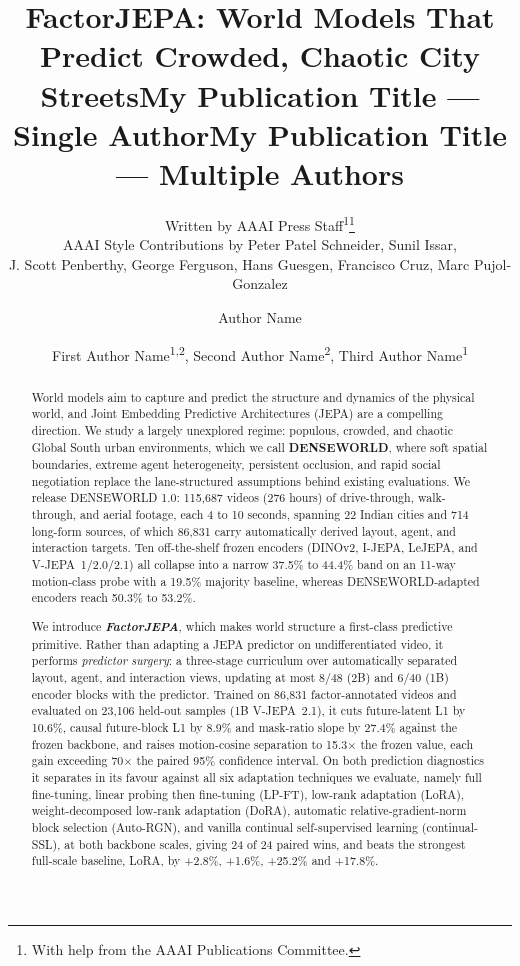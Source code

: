 \documentclass[letterpaper]{article} %
\title{FactorJEPA: World Models That Predict Crowded, Chaotic City Streets}
\author{
    Written by AAAI Press Staff\textsuperscript{\rm 1}\thanks{With help from the AAAI Publications Committee.}\\
    AAAI Style Contributions by Peter Patel Schneider,
    Sunil Issar,\\
    J. Scott Penberthy,
    George Ferguson,
    Hans Guesgen,
    Francisco Cruz\equalcontrib\corresponding,
    Marc Pujol-Gonzalez\equalcontrib\corresponding
}
\title{My Publication Title --- Single Author}
\author {
    Author Name
}
\title{My Publication Title --- Multiple Authors}
\author {
    First Author Name\textsuperscript{\rm 1,\rm 2}\equalcontrib,
    Second Author Name\textsuperscript{\rm 2}\equalcontrib,
    Third Author Name\textsuperscript{\rm 1}\corresponding
}
\begin{document}
\maketitle

\begin{abstract}


World models aim to capture and predict the structure and dynamics of the physical world, and Joint Embedding Predictive Architectures (JEPA) are a compelling direction. We study a largely unexplored regime: populous, crowded, and chaotic Global South urban environments, which we call \textbf{DENSEWORLD}, where soft spatial boundaries, extreme agent heterogeneity, persistent occlusion, and rapid social negotiation replace the lane-structured assumptions behind existing evaluations. We release DENSEWORLD 1.0: 115,687 videos (276 hours) of drive-through, walk-through, and aerial footage, each 4 to 10 seconds, spanning 22 Indian cities and 714 long-form sources, of which 86,831 carry automatically derived layout, agent, and interaction targets. Ten off-the-shelf frozen encoders (DINOv2, I-JEPA, LeJEPA, and V-JEPA~1/2.0/2.1) all collapse into a narrow 37.5\% to 44.4\% band on an 11-way motion-class probe with a 19.5\% majority baseline, whereas DENSEWORLD-adapted encoders reach 50.3\% to 53.2\%.

We introduce \textbf{\emph{FactorJEPA}}, which makes world structure a first-class predictive primitive. Rather than adapting a JEPA predictor on undifferentiated video, it performs \emph{predictor surgery}: a three-stage curriculum over automatically separated layout, agent, and interaction views, updating at most 8/48 (2B) and 6/40 (1B) encoder blocks with the predictor. Trained on 86,831 factor-annotated videos and evaluated on 23,106 held-out samples (1B V-JEPA~2.1), it cuts future-latent L1 by 10.6\%, causal future-block L1 by 8.9\% and mask-ratio slope by 27.4\% against the frozen backbone, and raises motion-cosine separation to 15.3$\times$ the frozen value, each gain exceeding 70$\times$ the paired 95\% confidence interval. On both prediction diagnostics it separates in its favour against all six adaptation techniques we evaluate, namely full fine-tuning, linear probing then fine-tuning (LP-FT), low-rank adaptation (LoRA), weight-decomposed low-rank adaptation (DoRA), automatic relative-gradient-norm block selection (Auto-RGN), and vanilla continual self-supervised learning (continual-SSL), at both backbone scales, giving 24 of 24 paired wins, and beats the strongest full-scale baseline, LoRA, by +2.8\%, +1.6\%, +25.2\% and +17.8\%.


\end{abstract}
\end{document}
